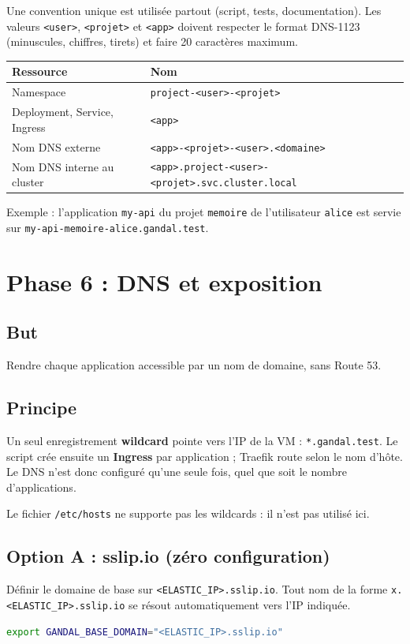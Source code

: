\documentclass[12pt,a4paper]{article}
\begin{document}
Une convention unique est utilisée partout (script, tests, documentation). Les valeurs \nolinkurl{<user>}, \nolinkurl{<projet>} et \nolinkurl{<app>} doivent respecter le format DNS-1123 (minuscules, chiffres, tirets) et faire 20 caractères maximum.

\begin{center}
\begin{tabular}{ll}
\toprule
\textbf{Ressource} & \textbf{Nom} \\
\midrule
Namespace & \nolinkurl{project-<user>-<projet>} \\
Deployment, Service, Ingress & \nolinkurl{<app>} \\
Nom DNS externe & \nolinkurl{<app>-<projet>-<user>.<domaine>} \\
Nom DNS interne au cluster & \nolinkurl{<app>.project-<user>-<projet>.svc.cluster.local} \\
\bottomrule
\end{tabular}
\end{center}

Exemple : l'application \texttt{my-api} du projet \texttt{memoire} de l'utilisateur \texttt{alice} est servie sur \nolinkurl{my-api-memoire-alice.gandal.test}.

\section{Phase 6 : DNS et exposition}

\subsection{But}
Rendre chaque application accessible par un nom de domaine, sans Route 53.

\subsection{Principe}
Un seul enregistrement \textbf{wildcard} pointe vers l'IP de la VM : \nolinkurl{*.gandal.test}. Le script crée ensuite un \textbf{Ingress} par application ; Traefik route selon le nom d'hôte. Le DNS n'est donc configuré qu'une seule fois, quel que soit le nombre d'applications.

Le fichier \texttt{/etc/hosts} ne supporte pas les wildcards : il n'est pas utilisé ici.

\subsection{Option A : sslip.io (zéro configuration)}
Définir le domaine de base sur \nolinkurl{<ELASTIC_IP>.sslip.io}. Tout nom de la forme \nolinkurl{x.<ELASTIC_IP>.sslip.io} se résout automatiquement vers l'IP indiquée.
\begin{lstlisting}[language=bash]
export GANDAL_BASE_DOMAIN="<ELASTIC_IP>.sslip.io"
\end{lstlisting}
\end{document}
